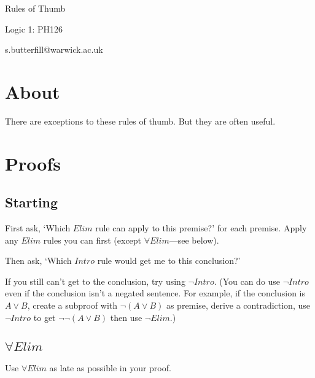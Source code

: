 \documentclass[11pt]{extarticle}
\date{}
\begin{document}
\begin{multicols}{3}

\setlength\footnotesep{1em}









\begin{center}
{\Large
Rules of Thumb}

Logic 1: PH126

s.butterfill@warwick.ac.uk
\end{center}


\section{About}
There are exceptions to these rules of thumb.
But they are often useful.

\section{Proofs}

\subsection{Starting}
First ask, ‘Which $Elim$ rule can apply to this premise?’ for each premise.
Apply any $Elim$ rules you can first (except $\forall Elim$---see below).

Then ask, ‘Which $Intro$ rule would get me to this conclusion?’

If you still can’t get to the conclusion, try using $\lnot Intro$.
(You can do use $\lnot Intro$ even if the conclusion isn’t a negated sentence.
For example, if the conclusion is $A \lor B$, create a subproof with $\lnot(A \lor B)$ as premise, derive a contradiction, use $\lnot Intro$ to get $\lnot \lnot(A \lor B)$ then use $\lnot Elim$.)


\subsection{$\forall Elim$}
Use $\forall Elim$ as late as possible in your proof.


\end{multicols}
\end{document}
